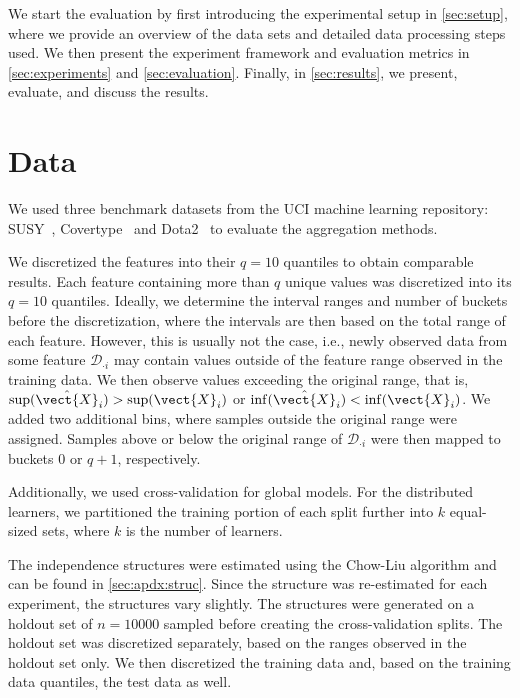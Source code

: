 We start the evaluation by first introducing the experimental setup in \autoref{sec:setup}, where we provide an overview of the data sets and detailed data processing steps used.
We then present the experiment framework and evaluation metrics in \autoref{sec:experiments} and \autoref{sec:evaluation}.
Finally, in \autoref{sec:results}, we present, evaluate, and discuss the results.

\section{Data}
\label{sec:setup}

We used three benchmark datasets from the UCI machine learning repository: SUSY~\cite{baldi2014searching}, Covertype~\cite{blackard2000comparison} and Dota2~\cite{tridgell2016dota2} to evaluate the aggregation methods.


We discretized the features into their $q=10$ quantiles to obtain comparable results.
Each feature containing more than $q$ unique values was discretized into its $q=10$ quantiles.
Ideally, we determine the interval ranges and number of buckets before the discretization, where the intervals are then based on the total range of each feature.
However, this is usually not the case, i.e., newly observed data from some feature $\mathcal{D}_{\cdot i}$ may contain values outside of the feature range observed in the training data. 
We then observe values exceeding the original range, that is, $\sup(\hat{\vect{X}}_i) > \sup(\vect{X}_i) $ or  $\inf(\hat{\vect{X}}_i) < \inf(\vect{X}_i) $.
We added two additional bins, where samples outside the original range were assigned.
Samples above or below the original range of $\mathcal{D}_{\cdot i}$ were then mapped to buckets $0$ or $q+1$, respectively.

Additionally, we used cross-validation for global models. 
For the distributed learners, we partitioned the training portion of each split further into $k$ equal-sized sets, where $k$ is the number of learners.

The independence structures were estimated using the Chow-Liu algorithm and can be found in \autoref{sec:apdx:struc}.
Since the structure was re-estimated for each experiment, the structures vary slightly.
The structures were generated on a holdout set of $n=10000$ sampled before creating the cross-validation splits.
The holdout set was discretized separately, based on the ranges observed in the holdout set only.
We then discretized the training data and, based on the training data quantiles, the test data as well.

